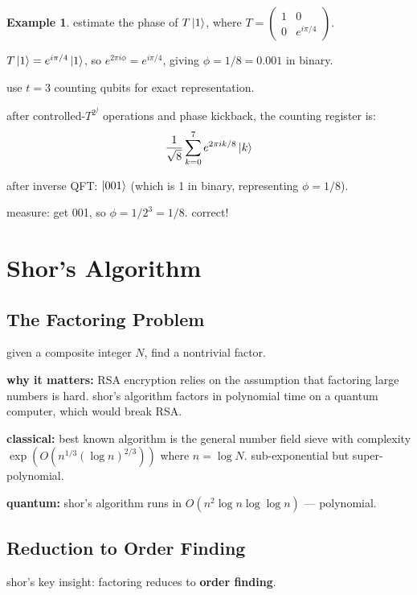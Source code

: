 \documentclass[11pt,a4paper]{article}
\theoremstyle{definition}
\newtheorem{example}{Example}[section]
\theoremstyle{remark}
\begin{document}
\begin{example}
estimate the phase of $T\ket{1}$, where $T = \begin{pmatrix} 1 & 0 \\ 0 & e^{i\pi/4} \end{pmatrix}$.

$T\ket{1} = e^{i\pi/4}\ket{1}$, so $e^{2\pi i\phi} = e^{i\pi/4}$, giving $\phi = 1/8 = 0.001$ in binary.

use $t = 3$ counting qubits for exact representation.

after controlled-$T^{2^j}$ operations and phase kickback, the counting register is:
\[
\frac{1}{\sqrt{8}}\sum_{k=0}^{7} e^{2\pi i k/8}\ket{k}
\]

after inverse QFT: $\ket{001}$ (which is 1 in binary, representing $\phi = 1/8$).

measure: get 001, so $\phi = 1/2^3 = 1/8$. correct!
\end{example}

\section{Shor's Algorithm}

\subsection{The Factoring Problem}

given a composite integer $N$, find a nontrivial factor.

\textbf{why it matters:} RSA encryption relies on the assumption that factoring large numbers is hard. shor's algorithm factors in polynomial time on a quantum computer, which would break RSA.

\textbf{classical:} best known algorithm is the general number field sieve with complexity $\exp(O(n^{1/3}(\log n)^{2/3}))$ where $n = \log N$. sub-exponential but super-polynomial.

\textbf{quantum:} shor's algorithm runs in $O(n^2 \log n \log\log n)$ --- polynomial.

\subsection{Reduction to Order Finding}

shor's key insight: factoring reduces to \textbf{order finding}.
\end{document}
